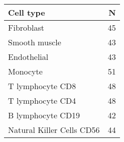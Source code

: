 \begin{table}[ht]
\centering
\begin{tabular}{lr}
  \hline
Cell type & N \\ 
  \hline
Fibroblast &  45 \\ 
  Smooth muscle &  43 \\ 
  Endothelial &  43 \\ 
  Monocyte &  51 \\ 
  T lymphocyte CD8 &  48 \\ 
  T lymphocyte CD4 &  48 \\ 
  B lymphocyte CD19 &  42 \\ 
  Natural Killer Cells CD56 &  44 \\ 
   \hline
\end{tabular}
\label{supp-tbl2}
\end{table}
